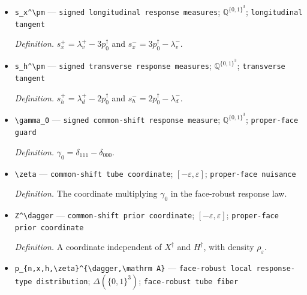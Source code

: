 \documentclass{article}
\begin{document}
\begin{itemize}
  \par\smallskip\noindent\emph{Definition.} \(\mathsf B=[v,d^\dagger,\mathbf1]\), with inverse in \(\mathrm{def:face\text{-}robust\text{-}directional\text{-}ledger}\).
  \item \texttt{s\_\allowbreak{}x\textasciicircum{}\textbackslash{}\allowbreak{}pm} --- \texttt{signed longitudinal response measures}; \(\mathbb Q^{\{0,1\}^3}\); \texttt{longitudinal tangent}
  \par\smallskip\noindent\emph{Definition.} \(s_x^+=\lambda_v^+-3p_0^\dagger\) and \(s_x^-=3p_0^\dagger-\lambda_v^-\).
  \item \texttt{s\_\allowbreak{}h\textasciicircum{}\textbackslash{}\allowbreak{}pm} --- \texttt{signed transverse response measures}; \(\mathbb Q^{\{0,1\}^3}\); \texttt{transverse tangent}
  \par\smallskip\noindent\emph{Definition.} \(s_h^+=\lambda_d^+-2p_0^\dagger\) and \(s_h^-=2p_0^\dagger-\lambda_d^-\).
  \item \texttt{\textbackslash{}\allowbreak{}gamma\_\allowbreak{}0} --- \texttt{signed common-\allowbreak{}shift response measure}; \(\mathbb Q^{\{0,1\}^3}\); \texttt{proper-\allowbreak{}face guard}
  \par\smallskip\noindent\emph{Definition.} \(\gamma_0=\delta_{111}-\delta_{000}\).
  \item \texttt{\textbackslash{}\allowbreak{}zeta} --- \texttt{common-\allowbreak{}shift tube coordinate}; \([-\varepsilon,\varepsilon]\); \texttt{proper-\allowbreak{}face nuisance}
  \par\smallskip\noindent\emph{Definition.} The coordinate multiplying \(\gamma_0\) in the face-robust response law.
  \item \texttt{Z\textasciicircum{}\textbackslash{}\allowbreak{}dagger} --- \texttt{common-\allowbreak{}shift prior coordinate}; \([-\varepsilon,\varepsilon]\); \texttt{proper-\allowbreak{}face prior coordinate}
  \par\smallskip\noindent\emph{Definition.} A coordinate independent of \(X^\dagger\) and \(H^\dagger\), with density \(\rho_\varepsilon\).
  \item \texttt{p\_\allowbreak{}\{n,\allowbreak{}x,\allowbreak{}h,\allowbreak{}\textbackslash{}\allowbreak{}zeta\}\allowbreak{}\textasciicircum{}\{\textbackslash{}\allowbreak{}dagger,\allowbreak{}\textbackslash{}\allowbreak{}mathrm A\}\allowbreak{}} --- \texttt{face-\allowbreak{}robust local response-\allowbreak{}type distribution}; \(\Delta(\{0,1\}^3)\); \texttt{face-\allowbreak{}robust tube fiber}

\end{itemize}
\end{document}
